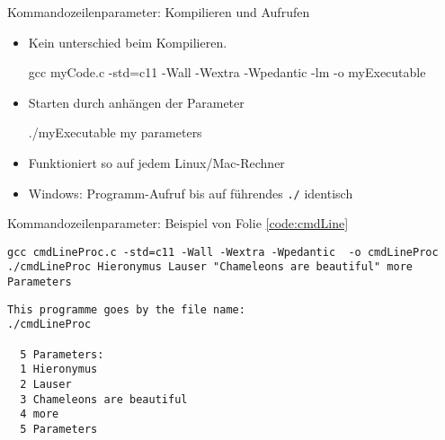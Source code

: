 
\begin{frame}[fragile]{Kommandozeilenparameter: Kompilieren und Aufrufen}
%
\begin{itemize}
\item Kein unterschied beim Kompilieren.
	\begin{cmdbox}
	\footnotesize 
	gcc myCode.c -std=c11 -Wall -Wextra -Wpedantic -lm -o myExecutable
	\end{cmdbox}
\item Starten durch anhängen der Parameter
	\begin{cmdbox}
	\footnotesize 
	./myExecutable {\color{cyan} my parameters}
	\end{cmdbox}
\item Funktioniert so auf jedem Linux/Mac-Rechner
\item Windows: Programm-Aufruf bis auf führendes \texttt{./} identisch
\end{itemize}
%
\end{frame}


\begin{frame}[fragile]{Kommandozeilenparameter: Beispiel von Folie \ref{code:cmdLine}}
%
\begin{cmdbox}
\begin{verbatim}
gcc cmdLineProc.c -std=c11 -Wall -Wextra -Wpedantic  -o cmdLineProc
./cmdLineProc Hieronymus Lauser "Chameleons are beautiful" more Parameters
\end{verbatim}
\end{cmdbox}
%
\begin{cmdbox}[Ausgabe]
\begin{verbatim}
This programme goes by the file name:
./cmdLineProc

  5 Parameters:
  1	Hieronymus 
  2	Lauser 
  3	Chameleons are beautiful
  4	more 
  5	Parameters
\end{verbatim}
\end{cmdbox}
%
\end{frame}